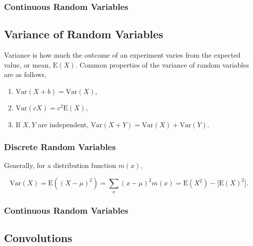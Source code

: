 \documentclass[12pt]{article}
\begin{document}
\subsubsection*{Continuous Random Variables}

\subsection*{Variance of Random Variables}
\noindent
Variance is how much the outcome of an experiment varies from the expected value, or mean, $\text{E}(X)$. Common properties of the variance of random variables are as follows,

\begin{enumerate}
\item $\text{Var}(X + b) = \text{Var}(X)$,
\item $\text{Var}(cX) = c^2 \text{E}(X)$,
\item If $X,Y$ are independent, $\text{Var}(X + Y) = \text{Var}(X) + \text{Var}(Y)$.
\end{enumerate}

\subsubsection*{Discrete Random Variables}
\noindent
Generally, for a distribution function $m(x)$,

\begin{equation*}
\text{Var}(X) = \text{E}((X-\mu)^2) = \sum_{x} (x - \mu)^2 m(x) = \text{E}(X^2) - \big [ \text{E}(X)^2 \big ].
\end{equation*}

\subsubsection*{Continuous Random Variables}

\begin{center}
\item \section*{Convolutions}
\end{center}
\end{document}
